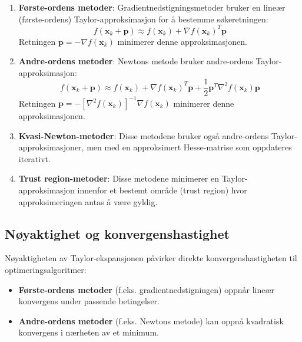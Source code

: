 \begin{enumerate}
	\item \textbf{Første-ordens metoder}: Gradientnedstigningsmetoder bruker en lineær (første-ordens) Taylor-approksimasjon for å bestemme søkeretningen:
	      \begin{equation}
		      f(\symbf{x}_k + \symbf{p}) \approx f(\symbf{x}_k) + \nabla f(\symbf{x}_k)^T\symbf{p}
	      \end{equation}
	      Retningen $\symbf{p} = -\nabla f(\symbf{x}_k)$ minimerer denne approksimasjonen.

	\item \textbf{Andre-ordens metoder}: Newtons metode bruker andre-ordens Taylor-approksimasjon:
	      \begin{equation}
		      f(\symbf{x}_k + \symbf{p}) \approx f(\symbf{x}_k) + \nabla f(\symbf{x}_k)^T\symbf{p} + \frac{1}{2}\symbf{p}^T\nabla^2 f(\symbf{x}_k)\symbf{p}
	      \end{equation}
	      Retningen $\symbf{p} = -[\nabla^2 f(\symbf{x}_k)]^{-1}\nabla f(\symbf{x}_k)$ minimerer denne approksimasjonen.

	\item \textbf{Kvasi-Newton-metoder}: Disse metodene bruker også andre-ordens Taylor-approksimasjoner, men med en approksimert Hesse-matrise som oppdateres iterativt.

	\item \textbf{Trust region-metoder}: Disse metodene minimerer en Taylor-approksimasjon innenfor et bestemt område (trust region) hvor approksimeringen antas å være gyldig.
\end{enumerate}

\subsection{Nøyaktighet og konvergenshastighet}

Nøyaktigheten av Taylor-ekspansjonen påvirker direkte konvergenshastigheten til optimeringsalgoritmer:

\begin{itemize}
	\item \textbf{Første-ordens metoder} (f.eks. gradientnedstigningen) oppnår lineær konvergens under passende betingelser.
	\item \textbf{Andre-ordens metoder} (f.eks. Newtons metode) kan oppnå kvadratisk konvergens i nærheten av et minimum.
\end{itemize}

